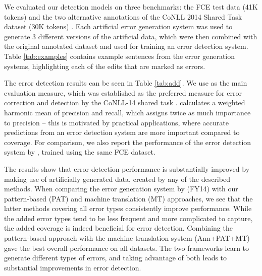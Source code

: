 \documentclass[11pt,letterpaper]{article}
\begin{document}
We evaluated our detection models on three benchmarks: the FCE test data (41K tokens) and the two alternative annotations of the CoNLL 2014 Shared Task dataset (30K tokens) \cite{Ng2013a}.
Each artificial error generation system was used to generate 3 different versions of the artificial data, which were then combined with the original annotated dataset and used for training an error detection system.
Table \ref{tab:examples} contains example sentences from the error generation systems, highlighting each of the edits that are marked as errors.



































The error detection results can be seen in Table \ref{tab:add}. We use  as the main evaluation measure, which was established as the preferred measure for error correction and detection by the CoNLL-14 shared task \cite{Ng2013a}.  calculates a weighted harmonic mean of precision and recall, which assigns twice as much importance to precision -- this is motivated by practical applications, where accurate predictions from an error detection system are more important compared to coverage. For comparison, we also report the performance of the error detection system by , trained using the same FCE dataset.

The results show that error detection performance is substantially improved by making use of artificially generated data, created by any of the described methods.
When comparing the error generation system by  (FY14) with our pattern-based (PAT) and machine translation (MT) approaches, we see that the latter methods covering all error types consistently improve performance. 
While the added error types tend to be less frequent and more complicated to capture, the added coverage is indeed beneficial for error detection.
Combining the pattern-based approach with the machine translation system (Ann+PAT+MT) gave the best overall performance on all datasets. The two frameworks learn to generate different types of errors, and taking advantage of both leads to substantial improvements in error detection.
\end{document}
